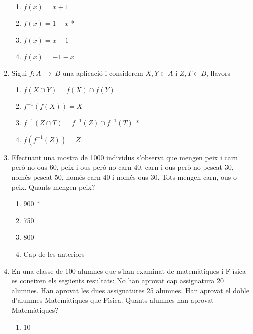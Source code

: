 \begin{enumerate}
\begin{enumerate}
\item $f(x)=x+1$

\item $f(x)=1-x$ *

\item $f(x)=x-1$

\item $f(x)=-1-x$
\end{enumerate}

\item Sigui $f:A~\longrightarrow~B$ una aplicaci\'{o} i considerem $%
X,Y\subset A$ i $Z,T\subset B$, llavors

\begin{enumerate}
\item $f(X\cap Y)=f(X)\cap f(Y)$

\item $f^{-1}\left( f(X)\right) =X$

\item $f^{-1}(Z\cap T)=f^{-1}(Z)\cap f^{-1}(T)$ *

\item $f\left( f^{-1}(Z)\right) =Z$
\end{enumerate}

\item Efectuant una mostra de 1000 individus s'observa que mengen peix i
carn per\`{o} no ous 60, peix i ous per\`{o} no carn 40, carn i ous per\`{o}
no pescat 30, nom\'{e}s pescat 50, nom\'{e}s carn 40 i nom\'{e}s ous 30.
Tots mengen carn, ous o peix. Quants mengen peix?

\begin{enumerate}
\item 900 *

\item 750

\item 800

\item Cap de les anteriors
\end{enumerate}

\item En una classe de 100 alumnes que s'han examinat de matem\`{a}tiques i F%
\'{\i}sica es coneixen els seg\"{u}ents resultats: No han aprovat cap
assignatura 20 alumnes. Han aprovat les dues assignatures 25 alumnes. Han
aprovat el doble d'alumnes Matem\`{a}tiques que F\'{\i}sica.
\textquestiondown Quants alumnes han aprovat Matem\`{a}tiques?

\begin{enumerate}
\item 10


\end{enumerate}
\end{enumerate}
